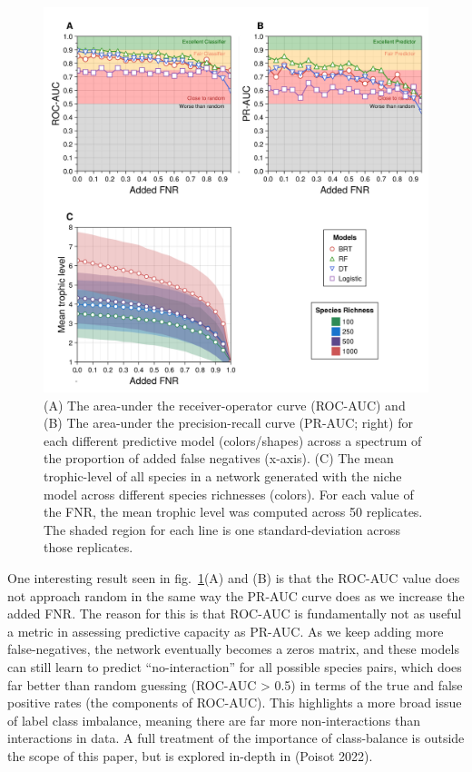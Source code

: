 \documentclass[10pt,oneside]{article}
\makeatletter
\def\maxwidth{\ifdim\Gin@nat@width>\linewidth\linewidth
\else\Gin@nat@width\fi}
\let\Oldincludegraphics\includegraphics
\renewcommand{\includegraphics}[1]{\Oldincludegraphics[width=\maxwidth]{#1}}
\makeatother
\begin{document}
\begin{figure}
\hypertarget{fig:addedfnr}{%
\centering
\includegraphics{./figures/fig3.png}
\caption{(A) The area-under the receiver-operator curve (ROC-AUC) and
(B) The area-under the precision-recall curve (PR-AUC; right) for each
different predictive model (colors/shapes) across a spectrum of the
proportion of added false negatives (x-axis). (C) The mean trophic-level
of all species in a network generated with the niche model across
different species richnesses (colors). For each value of the FNR, the
mean trophic level was computed across 50 replicates. The shaded region
for each line is one standard-deviation across those
replicates.}\label{fig:addedfnr}
}
\end{figure}

One interesting result seen in fig.~\ref{fig:addedfnr}(A) and (B) is
that the ROC-AUC value does not approach random in the same way the
PR-AUC curve does as we increase the added FNR. The reason for this is
that ROC-AUC is fundamentally not as useful a metric in assessing
predictive capacity as PR-AUC. As we keep adding more false-negatives,
the network eventually becomes a zeros matrix, and these models can
still learn to predict ``no-interaction'' for all possible species
pairs, which does far better than random guessing (ROC-AUC
\textgreater{} 0.5) in terms of the true and false positive rates (the
components of ROC-AUC). This highlights a more broad issue of label
class imbalance, meaning there are far more non-interactions than
interactions in data. A full treatment of the importance of
class-balance is outside the scope of this paper, but is explored
in-depth in (Poisot 2022).
\end{document}
